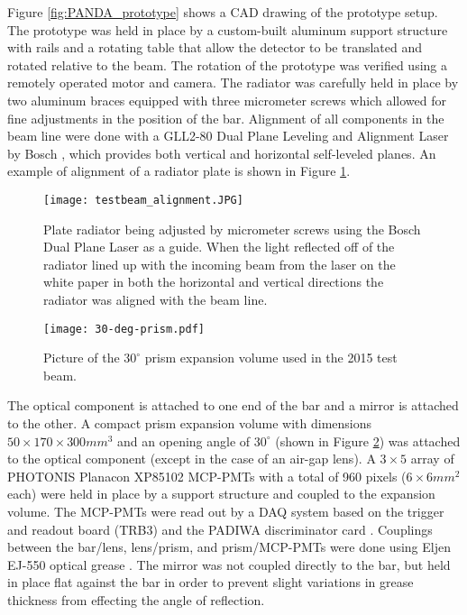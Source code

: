 Figure \ref{fig:PANDA_prototype} shows a CAD drawing of the prototype setup. The prototype was held in place by a custom-built aluminum support structure with rails and a rotating table that allow the detector to be translated and rotated relative to the beam. The rotation of the prototype was verified using a remotely operated motor and camera. The radiator was carefully held in place by two aluminum braces equipped with three micrometer screws which allowed for fine adjustments in the position of the bar. Alignment of all components in the beam line were done with a GLL2-80 Dual Plane Leveling and Alignment Laser by Bosch \cite{BoschLaser}, which provides both vertical and horizontal self-leveled planes. An example of alignment of a radiator plate is shown in Figure \ref{fig:testbeam_alignment}. 

\begin{figure}[!htb]
	\centering
	\texttt{[image: testbeam\_alignment.JPG]}
	\caption{Plate radiator being adjusted by micrometer screws using the Bosch Dual Plane Laser as a guide. When the light reflected off of the radiator lined up with the incoming beam from the laser on the white paper in both the horizontal and vertical directions the radiator was aligned with the beam line.}
	\label{fig:testbeam_alignment}
\end{figure}

\begin{figure}[!htb]
	\centering
	\texttt{[image: 30-deg-prism.pdf]}
	\caption{Picture of the $30^{\circ}$ prism expansion volume used in the 2015 test beam.}
	\label{fig:prototype_prism}
\end{figure}

The optical component is attached to one end of the bar and a mirror is attached to the other. A compact prism expansion volume with dimensions $50\times170\times300\unit{mm}^3$ and an opening angle of $30^\circ$ (shown in Figure \ref{fig:prototype_prism}) was attached to the optical component (except in the case of an air-gap lens). A $3\times5$ array of PHOTONIS Planacon XP85102 MCP-PMTs with a total of 960 pixels ($6\times6\unit{mm}^2$ each) were held in place by a support structure and coupled to the expansion volume. The MCP-PMTs were read out by a DAQ system based on the trigger and readout board (TRB3) and the PADIWA discriminator card \cite{PANDA_electronics}. Couplings between the bar/lens, lens/prism, and prism/MCP-PMTs were done using Eljen EJ-550 optical grease \cite{EljenTech}. The mirror was not coupled directly to the bar, but held in place flat against the bar in order to prevent slight variations in grease thickness from effecting the angle of reflection.

